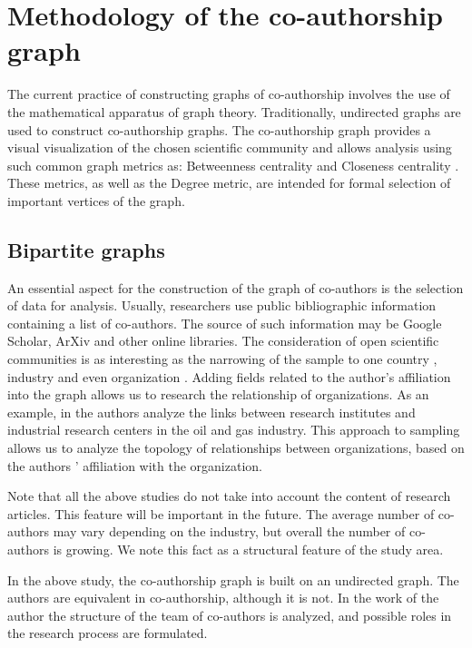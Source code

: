 \documentclass[12pt]{report}
\theoremstyle{definition}
\begin{document}
\section{Methodology of the co-authorship graph}
\label{sec:coat}
The current practice of constructing graphs of co-authorship involves the use of the mathematical apparatus of graph theory. 
Traditionally, undirected graphs are used to construct co-authorship graphs.
The co-authorship graph provides a visual visualization of the chosen scientific community and allows analysis using such common graph metrics as: Betweenness centrality \cite{leifeld2017collaboration, koseoglu2018authorship,ho2017basic} and Closeness centrality \cite{chang2017hidden,paraschiv2017semantic,ahmed2017analysis}. 
These metrics, as well as the Degree metric, are intended for formal selection of important vertices of the graph.

\subsection{Bipartite graphs}
\label{sec:coath}
An essential aspect for the construction of the graph of co-authors is the selection of data for analysis. 
Usually, researchers use public bibliographic information containing a list of co-authors. 
The source of such information may be Google Scholar, ArXiv and other online libraries. 
The consideration of open scientific communities is as interesting as the narrowing of the sample to one country \cite{krasnov2013measurement}, industry \cite{gielfi2017university} and even organization \cite{kradoya2016structure}.
Adding fields related to the author's affiliation into the graph allows us to research the relationship of organizations.
As an example, in \cite{gielfi2017university} the authors analyze the links between research institutes and industrial research centers in the oil and gas industry.
This approach to sampling allows us to analyze the topology of relationships between organizations, based on the authors ' affiliation with the organization. 

Note that all the above studies do not take into account the content of research articles.
This feature will be important in the future. 
The average number of co-authors may vary depending on the industry, but overall the number of co-authors is growing.
We note this fact as a structural feature of the study area. 

In the above study, the co-authorship graph is built on an undirected graph.
The authors are equivalent in co-authorship, although it is not. 
In the work of the author \cite{krasnov2017model} the structure of the team of co-authors is analyzed, and possible roles in the research process are formulated. 
\end{document}

